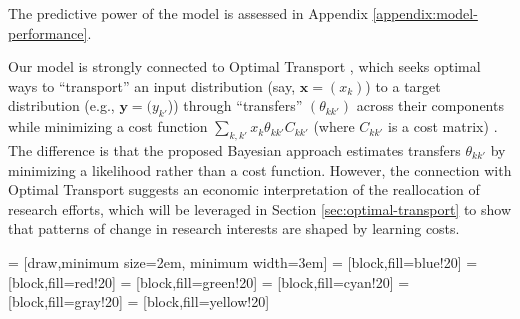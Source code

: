 \documentclass{article}
\begin{document}
The predictive power of the model is assessed in Appendix \ref{appendix:model-performance}. %

Our model is strongly connected to Optimal Transport \citep{muzellec2017tsallis,li2019learning}, which seeks optimal ways to  ``transport'' an input distribution (say, $\bm{x}=(x_k)$) to a target distribution (e.g., $\bm{y}=(y_{k'}$)) through ``transfers'' $(\theta_{kk'})$ across their components while minimizing a cost function $\sum_{k,k'} x_{k} \theta_{kk'}C_{kk'}$ (where $C_{kk'}$ is a cost matrix) \citep{Peyr2019}. The difference is that the proposed Bayesian approach estimates transfers $\theta_{kk'}$ by minimizing a likelihood rather than a cost function. However, the connection with Optimal Transport suggests an economic interpretation of the reallocation of research efforts, which will be leveraged in Section \ref{sec:optimal-transport} to show that patterns of change in research interests are shaped by learning costs. %


     = [draw,minimum size=2em, minimum width=3em]
     = [block,fill=blue!20]
     = [block,fill=red!20]
     = [block,fill=green!20]
     = [block,fill=cyan!20]
     = [block,fill=gray!20]
     = [block,fill=yellow!20]
    
\end{document}
